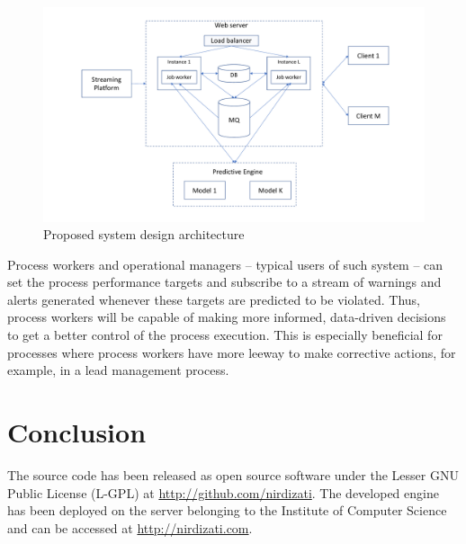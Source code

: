 \documentclass[runningheads,a4paper]{llncs}
\begin{document}
\begin{figure}
	\centering
	\includegraphics[width=1\textwidth]{img/nirdizati-runtime-architecture}
	\caption{Proposed system design architecture}
	\label{fig:arch}
\end{figure}

Process workers and operational managers – typical users of such system – can set the process performance targets and subscribe to a stream of warnings and alerts generated whenever these targets are predicted to be violated. Thus, process workers will be capable of making more informed, data-driven decisions to get a better control of the process execution. This is especially beneficial for processes where process workers have more leeway to make corrective actions, for example, in a lead management process.

\section{Conclusion} \label{sec:conclusion}
The source code has been released as open source software under the Lesser GNU Public License (L-GPL) at \url{http://github.com/nirdizati}. The developed engine has been deployed on the server belonging to the Institute of Computer Science and can be accessed at \url{http://nirdizati.com}.


\end{document}
